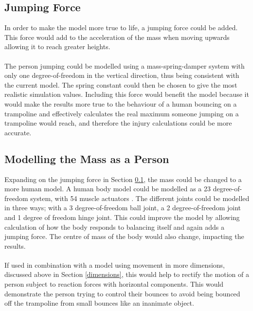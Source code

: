 \subsection{Jumping Force}\label{jumpforce}
In order to make the model more true to life, a jumping force could be added. This force would add to the acceleration of the mass when moving upwards allowing it to reach greater heights.
\\
\\
The person jumping could be modelled using a mass-spring-damper system \cite{springbok} with only one degree-of-freedom in the vertical direction, thus being consistent with the current model. The spring constant could then be chosen to give the most realistic simulation values.  
\noindent Including this force would benefit the model because it would make the results more true to the behaviour of a human bouncing on a trampoline and effectively calculates the real maximum someone jumping on a trampoline would reach, and therefore the injury calculations could be more accurate. 

\subsection{Modelling the Mass as a Person}
\noindent Expanding on the jumping force in Section \ref{jumpforce}, the mass could be changed to a more human model. A human body model could be modelled as a 23 degree-of-freedom system, with 54 muscle actuators \cite{tadfonline}. The different joints could be modelled in three ways; with a 3 degree-of-freedom ball joint, a 2 degree-of-freedom joint and 1 degree of freedom hinge joint. This could improve the model by allowing calculation of how the body responds to balancing itself and again adds a jumping force. The centre of mass of the body would also change, impacting the results.
\\
\\
\noindent If used in combination with a model using movement in more dimensions, discussed above in Section \ref{dimensions}, this would help to rectify the motion of a person subject to reaction forces with horizontal components. This would demonstrate the person trying to control their bounces to avoid being bounced off the trampoline from small bounces like an inanimate object.%






